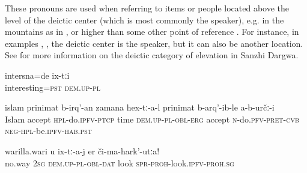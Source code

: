 These pronouns are used when referring to items or people located above the level of the deictic center (which is most commonly the speaker), e.g. in the mountains as in ,  or higher than some other point of reference . For instance, in examples , , the deictic center is the speaker, but it can also be another location. See \citet{ForkerLTSanzhi} for more information on the deictic category of elevation in Sanzhi Dargwa.
%
\begin{exe}
		\label{They were interesting.}
	\sn
	\gll	intersna=de	ix-tːi \\
		interesting=\textsc{pst}	\textsc{dem.up}-\textsc{pl}\\
	\glt	{}

		\label{At the time when we became Muslims, they did not become Muslims.}
	\sn
	\gll	islam	prinimat	b-irq'-an	zamana	hex-tː-a-l	prinimat	b-arq'-ib-le	a-b-určː-i\\
		Islam	accept	\textsc{hpl}-do.\textsc{ipfv}-\textsc{ptcp}	time		\textsc{dem.up}-\textsc{pl}-\textsc{obl}-\textsc{erg}	accept	\textsc{n}-do.\textsc{pfv}-\textsc{pret}-\textsc{cvb}	\textsc{neg}-\textsc{hpl}-be.\textsc{ipfv}-\textsc{hab.}\textsc{\textsc{pst}}\\
	\glt	{}

		\label{Whatever may happen, do not look at them}
	\sn
	\gll	warilla.wari	u	ix-tː-a-j	er	či-ma-hark'-utːa!\\
		no.way	\textsc{2sg}	\textsc{dem.up}-\textsc{pl}-\textsc{obl}-\textsc{dat}	look	\textsc{spr}-\textsc{proh}-look.\textsc{ipfv}-\textsc{proh.sg}\\	
	\glt	{}

\end{exe}

